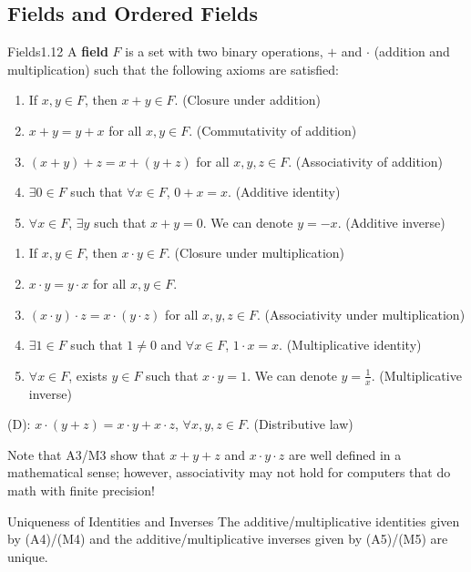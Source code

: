 \subsection{Fields and Ordered Fields}
\begin{definition}{Fields}{1.12}
    A \textbf{field} $F$ is a set with two binary operations, $+$ and $\cdot$ (addition and multiplication) such that the following axioms are satisfied:
    \begin{enumerate}[start=1, label={(A\arabic*):}]
    \item If $x, y \in F$, then $x + y \in F$. (Closure under addition)
    \item $x + y = y + x$ for all $x, y \in F$. (Commutativity of addition)
    \item $(x+y) + z = x + (y + z)$ for all $x, y, z \in F$. (Associativity of addition)
    \item $\exists 0 \in F$ such that $\forall x \in F$, $0 + x = x$. (Additive identity)
    \item $\forall x \in F$, $\exists y$ such that $x + y = 0$. We can denote $y = -x$. (Additive inverse)
    \end{enumerate}
    \begin{enumerate}[start=1, label={(M\arabic*):}]
        \item If $x, y \in F$, then $x\cdot y\in F$. (Closure under multiplication)
        \item $x \cdot y = y \cdot x$ for all $x, y \in F$.
        \item $(x\cdot y)\cdot z = x \cdot (y \cdot z)$ for all $x, y, z \in F$. (Associativity under multiplication)
        \item $\exists 1 \in F$ such that $1 \neq 0$ and $\forall x \in F$, $1 \cdot x = x$. (Multiplicative identity)
        \item $\forall x \in F$, exists $y \in F$ such that $x \cdot y = 1$. We can denote $y = \frac{1}{x}$. (Multiplicative inverse)
    \end{enumerate}
    (D): $x \cdot (y + z) = x \cdot y + x \cdot z$, $\forall x, y, z \in F$. (Distributive law)
\end{definition}
\noindent Note that A3/M3 show that $x + y + z$ and $x\cdot y\cdot z$ are well defined in a mathematical sense; however, associativity may not hold for computers that do math with finite precision! 
\begin{ntheorem}{Uniqueness of Identities and Inverses}
    The additive/multiplicative identities given by (A4)/(M4) and the additive/multiplicative inverses given by (A5)/(M5) are unique. 
\end{ntheorem}
